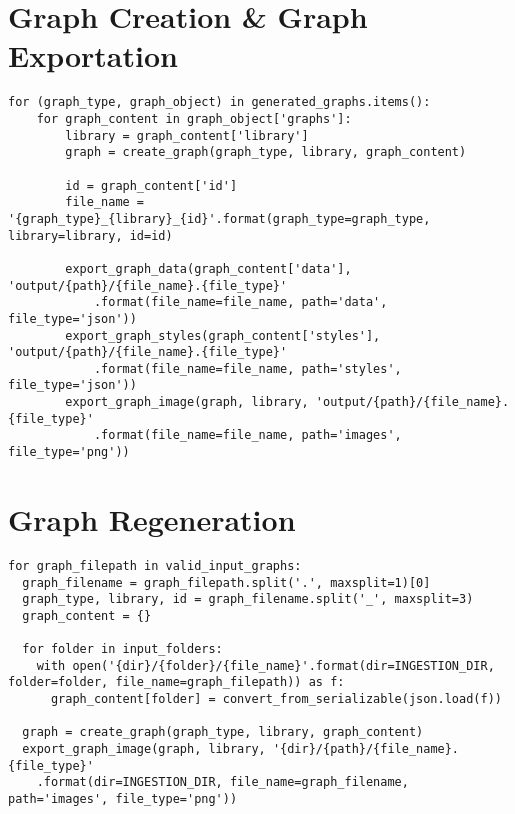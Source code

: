 \section{Graph Creation \& Graph Exportation}
\begin{lstlisting}
for (graph_type, graph_object) in generated_graphs.items():
    for graph_content in graph_object['graphs']:
        library = graph_content['library']
        graph = create_graph(graph_type, library, graph_content)
        
        id = graph_content['id']
        file_name = '{graph_type}_{library}_{id}'.format(graph_type=graph_type, library=library, id=id)
        
        export_graph_data(graph_content['data'], 'output/{path}/{file_name}.{file_type}'
            .format(file_name=file_name, path='data', file_type='json'))
        export_graph_styles(graph_content['styles'], 'output/{path}/{file_name}.{file_type}'
            .format(file_name=file_name, path='styles', file_type='json'))
        export_graph_image(graph, library, 'output/{path}/{file_name}.{file_type}'
            .format(file_name=file_name, path='images', file_type='png'))
\end{lstlisting}

\section{Graph Regeneration}
\begin{lstlisting}
for graph_filepath in valid_input_graphs:
  graph_filename = graph_filepath.split('.', maxsplit=1)[0]
  graph_type, library, id = graph_filename.split('_', maxsplit=3)
  graph_content = {}
  
  for folder in input_folders:
    with open('{dir}/{folder}/{file_name}'.format(dir=INGESTION_DIR, folder=folder, file_name=graph_filepath)) as f:
      graph_content[folder] = convert_from_serializable(json.load(f))
  
  graph = create_graph(graph_type, library, graph_content)
  export_graph_image(graph, library, '{dir}/{path}/{file_name}.{file_type}'
    .format(dir=INGESTION_DIR, file_name=graph_filename, path='images', file_type='png'))
\end{lstlisting}